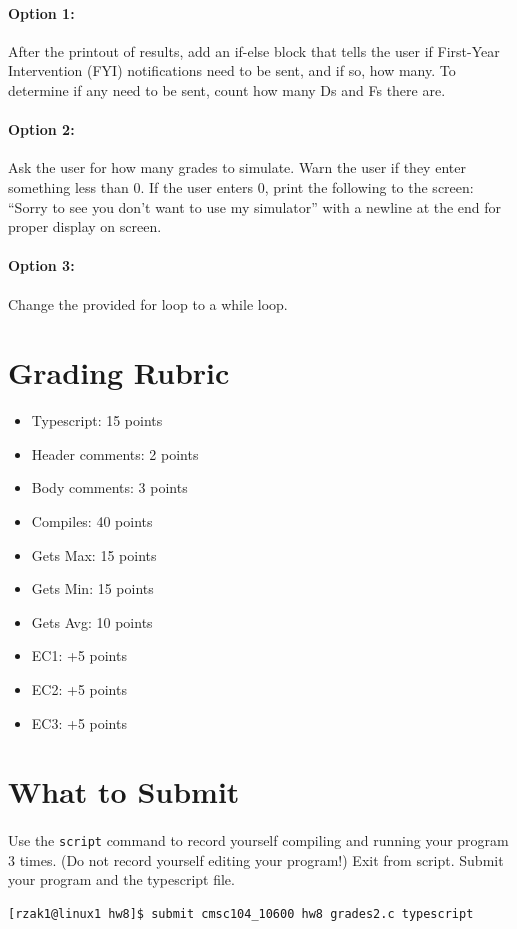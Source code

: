 \documentclass[letter,11pt]{article}
\begin{document}
\paragraph{Option 1:} After the printout of results, add an if-else block that tells the user if First-Year Intervention (FYI) notifications need to be sent, and if so, how many. To determine if any need to be sent, count how many Ds and Fs there are.
\paragraph{Option 2:} Ask the user for how many grades to simulate. Warn the user if they enter something less than 0. If the user enters 0, print the following to the screen: ``Sorry to see you don’t want to use my simulator'' with a newline at the end for proper display on screen.
\paragraph{Option 3:} Change the provided for loop to a while loop. 

\section*{Grading Rubric}
\begin{itemize}
    \item Typescript: 15 points
    \item Header comments: 2 points
    \item Body comments: 3 points
    \item Compiles: 40 points
    \item Gets Max: 15 points
    \item Gets Min: 15 points
    \item Gets Avg: 10 points
    \item EC1: +5 points
    \item EC2: +5 points
    \item EC3: +5 points
\end{itemize}

\section*{What to Submit}
\paragraph{}Use the \texttt{script} command to record yourself compiling and running your program 3 times. (Do not record yourself editing your program!) Exit from script. Submit your program and the typescript file.
\begin{verbatim}
[rzak1@linux1 hw8]$ submit cmsc104_10600 hw8 grades2.c typescript
\end{verbatim}
\end{document}
